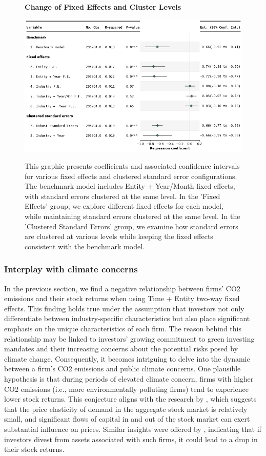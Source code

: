 \documentclass[12pt]{article}
\begin{document}
\begin{figure}[H]
\centering
\caption{\textbf{Change of Fixed Effects and Cluster Levels}}
\includegraphics[width=.8\textwidth]{image/forestplot.png}
\label{fig: forestplot}
\caption*{\footnotesize{This graphic presents coefficients and associated confidence intervals for various fixed effects and clustered standard error configurations. The benchmark model includes Entity + Year/Month fixed effects, with standard errors clustered at the same level. In the 'Fixed Effects' group, we explore different fixed effects for each model, while maintaining standard errors clustered at the same level. In the 'Clustered Standard Errors' group, we examine how standard errors are clustered at various levels while keeping the fixed effects consistent with the benchmark model.}}
\end{figure}

\subsubsection{Interplay with climate concerns}
In the previous section, we find a negative relationship between firms' CO2 emissions and their stock returns when using Time + Entity two-way fixed effects. This finding holds true under the assumption that investors not only differentiate between industry-specific characteristics but also place significant emphasis on the unique characteristics of each firm. The reason behind this relationship may be linked to investors' growing commitment to green investing mandates and their increasing concerns about the potential risks posed by climate change. Consequently, it becomes intriguing to delve into the dynamic between a firm's CO2 emissions and public climate concerns. One plausible hypothesis is that during periods of elevated climate concern, firms with higher CO2 emissions (i.e., more environmentally polluting firms) tend to experience lower stock returns. This conjecture aligns with the research by \cite{gabaix2021search}, which suggests that the price elasticity of demand in the aggregate stock market is relatively small, and significant flows of capital in and out of the stock market can exert substantial influence on prices. Similar insights were offered by \cite{koijen2019demand}, indicating that if investors divest from assets associated with such firms, it could lead to a drop in their stock returns.
\end{document}
